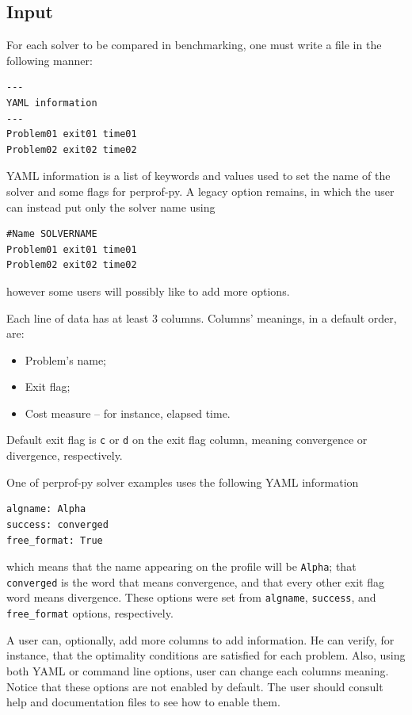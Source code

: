 \subsection*{Input}

    For each solver to be compared in  benchmarking, one must write a file in
    the following manner:

    \begin{verbatim}
---
YAML information
---
Problem01 exit01 time01
Problem02 exit02 time02
    \end{verbatim}

    YAML\cite{url:yaml,url:pyyaml} information is a list of keywords and values used to
    set the name of the solver and some
    flags for perprof-py.
    A legacy option remains, in which the user can instead put only the
    solver name using
\begin{verbatim}
#Name SOLVERNAME
Problem01 exit01 time01
Problem02 exit02 time02
\end{verbatim}
    however some users  will possibly like to
    add more options.

    Each line of data has at least 3 columns.
    Columns' meanings, in a default order, are:
    \begin{itemize}
      \item Problem's name;
      \item Exit flag;
      \item Cost measure -- for instance, elapsed time.
    \end{itemize}
    Default exit flag is  {\tt c} or {\tt d} on the exit flag
    column, meaning convergence or divergence, respectively.

    One of perprof-py solver examples  uses the following YAML information
\begin{verbatim}
algname: Alpha
success: converged
free_format: True
\end{verbatim}
    which means that the name appearing on the profile will be {\tt Alpha};
    that {\tt converged} is the word that means convergence,
    and that every other exit flag word means divergence.
    These options were set from {\tt algname}, {\tt success}, and {\tt
    free\_format} options, respectively.

    A user can, optionally, add more columns to add information.
    He can verify, for instance, that the optimality conditions are satisfied
    for each problem.
    Also, using  both YAML or command line options,  user can change each
    columns meaning.
    Notice that these options are not enabled by default. The user should
    consult  help and documentation files to see how to enable them.

